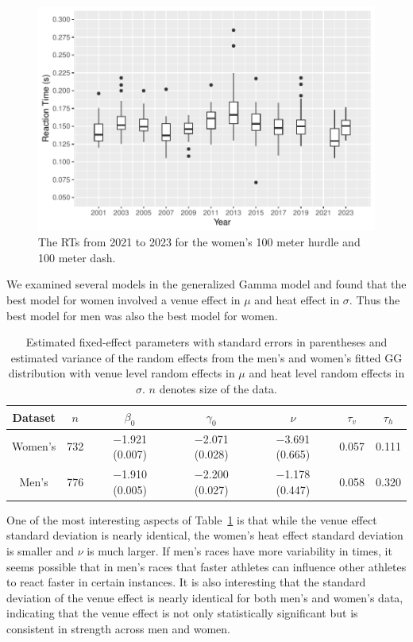 \documentclass[12pt, letterpaper]{article}
\begin{document}
\begin{figure}[tbp]
  \centering
  \includegraphics[width=\textwidth]{WomensBoxplot}
  \caption{The RTs from 2021 to 2023 for the women's 100 meter hurdle
  and 100 meter dash.}
  \label{fig:WomensBoxplot}
\end{figure}

We examined several models in the generalized Gamma model and found that the
best model for women involved a venue effect in $\mu$ and heat effect in
$\sigma$.  Thus the best model for men was also the best model for women.

\begin{table}
  \centering
  \caption{Estimated fixed-effect parameters with standard errors in
    parentheses and estimated variance of the random effects from the men's and
    women's fitted GG distribution with venue level random
    effects in $\mu$ and heat level random effects in $\sigma$. $n$ denotes
    size of the data.}
  \label{tab:womensfit}
  \begin{tabular}{c c c c c c c}
    \toprule
    Dataset & $n$ & $\beta_0$ & $\gamma_0$ & $\nu$ & $\tau_v$ & $\tau_h$ \\
    \midrule
    Women's & 732 & $-$1.921 (0.007) & $-$2.071 (0.028) & $-$3.691 (0.665) & 0.057 & 0.111 \\
    Men's & 776 & $-$1.910 (0.005) & $-$2.200 (0.027) & $-$1.178 (0.447) & 0.058 & 0.320 \\
    \bottomrule
  \end{tabular}
\end{table}

One of the most interesting aspects of Table~\ref{tab:womensfit} is that while
the venue effect standard deviation is nearly identical, the women's heat effect
standard deviation is smaller and $\nu$ is much larger.  If men's races have
more variability in times, it seems possible that in men's races that faster
athletes can influence other athletes to react faster in certain instances.
It is also interesting that the standard deviation of the venue effect is
nearly identical for both men's and women's data, indicating that the venue
effect is not only statistically significant but is consistent in strength
across men and women.
\end{document}

